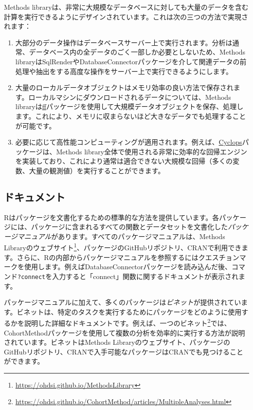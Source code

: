 \documentclass[
  11pt]{book}
\providecommand{\tightlist}{%
  \setlength{\itemsep}{0pt}\setlength{\parskip}{0pt}}
\theoremstyle{definition}
\theoremstyle{definition}
\theoremstyle{definition}
\theoremstyle{definition}
\theoremstyle{remark}
\begin{document}
Methods libraryは、非常に大規模なデータベースに対しても大量のデータを含む計算を実行できるようにデザインされています。これは次の三つの方法で実現されます：

\begin{enumerate}
\def\labelenumi{\arabic{enumi}.}
\tightlist
\item
  大部分のデータ操作はデータベースサーバー上で実行されます。分析は通常、データベース内の全データのごく一部しか必要としないため、Methods libraryはSqlRenderやDatabaseConnectorパッケージを介して関連データの前処理や抽出をする高度な操作をサーバー上で実行できるようにします。
\item
  大量のローカルデータオブジェクトはメモリ効率の良い方法で保存されます。ローカルマシンにダウンロードされるデータについては、Methods libraryは\href{https://cran.r-project.org/web/packages/ff}{ff}パッケージを使用して大規模データオブジェクトを保存、処理します。これにより、メモリに収まらないほど大きなデータでも処理することが可能です。
\item
  必要に応じて高性能コンピューティングが適用されます。例えば、\href{https://ohdsi.github.io/Cyclops/}{Cyclops}パッケージは、Methods library全体で使用される非常に効率的な回帰エンジンを実装しており、これにより通常は適合できない大規模な回帰（多くの変数、大量の観測値）を実行することができます。
\end{enumerate}

\subsection{ドキュメント}\label{ux30c9ux30adux30e5ux30e1ux30f3ux30c8-1}

Rはパッケージを文書化するための標準的な方法を提供しています。各パッケージには、パッケージに含まれるすべての関数とデータセットを文書化した\emph{パッケージマニュアル}があります。すべてのパッケージマニュアルは、Methods Libraryのウェブサイト\footnote{\url{https://ohdsi.github.io/MethodsLibrary}}、パッケージのGitHubリポジトリ、CRANで利用できます。さらに、Rの内部からパッケージマニュアルを参照するにはクエスチョンマークを使用します。例えばDatabaseConnectorパッケージを読み込んだ後、コマンド\texttt{?connect}を入力すると「connect」関数に関するドキュメントが表示されます。

パッケージマニュアルに加えて、多くのパッケージは\emph{ビネット}が提供されています。ビネットは、特定のタスクを実行するためにパッケージをどのように使用するかを説明した詳細なドキュメントです。例えば、一つのビネット\footnote{\url{https://ohdsi.github.io/CohortMethod/articles/MultipleAnalyses.html}}では、CohortMethodパッケージを使用して複数の分析を効率的に実行する方法が説明されています。ビネットはMethods Libraryのウェブサイト、パッケージのGitHubリポジトリ、CRANで入手可能なパッケージはCRANでも見つけることができます。 
\end{document}
